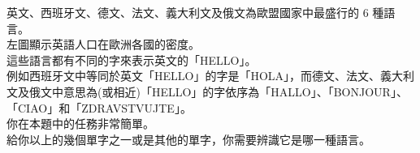英文、西班牙文、德文、法文、義大利文及俄文為歐盟國家中最盛行的 6 種語言。\\
左圖顯示英語人口在歐洲各國的密度。\\
這些語言都有不同的字來表示英文的「HELLO」。\\
例如西班牙文中等同於英文「HELLO」的字是「HOLA」，而德文、法文、義大利文及俄文中意思為(或相近)「HELLO」的字依序為「HALLO」、「BONJOUR」、「CIAO」和「ZDRAVSTVUJTE」。\\
你在本題中的任務非常簡單。\\
給你以上的幾個單字之一或是其他的單字，你需要辨識它是哪一種語言。\\
